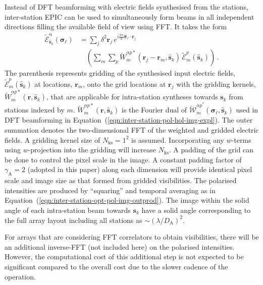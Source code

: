 \documentclass[
  journal=pasa,
  manuscript=article-type,
  year=2020,
  volume=37,
]{cup-journal}
\begin{document}
Instead of DFT beamforming with electric fields synthesised from the stations, inter-station EPIC can be used to simultaneously form beams in all independent directions filling the available field of view using FFT. It takes the form
\begin{align}
  \widetilde{\mathcal{E}}_{\hat{\boldsymbol{s}}_k}^\alpha(\boldsymbol{\sigma}_\ell) &= \sum_j \delta^2 \boldsymbol{r}_j \, e^{i\frac{2\pi}{\lambda} \hat{\boldsymbol{\sigma}}_\ell\cdot\boldsymbol{r}_j} \nonumber\\
  &\quad \left(\sum_{m} \sum_p \widetilde{W}_{m}^{\alpha p*}(\boldsymbol{r}_j-\boldsymbol{r}_{m},\hat{\boldsymbol{s}}_k) \, \widetilde{\mathcal{E}}_m^p(\hat{\boldsymbol{s}}_k) \right) \, . \label{eqn:inter-station-pol-hol-img-epic-expl}
\end{align}
The parenthesis represents gridding of the synthesised input electric fields, $\widetilde{\mathcal{E}}_m^p(\hat{\boldsymbol{s}}_k)$ at locations, $\boldsymbol{r}_{m}$, onto the grid locations at $\boldsymbol{r}_j$ with the gridding kernels, $\widetilde{W}_{m}^{\alpha p*}(\boldsymbol{r},\hat{\boldsymbol{s}}_k)$, that are applicable for intra-station syntheses towards $\boldsymbol{s}_k$ from stations indexed by $m$. $\widetilde{W}_{m}^{\alpha p*}(\boldsymbol{r},\hat{\boldsymbol{s}}_k)$ is the Fourier dual of $\widetilde{\mathcal{W}}_{m}^{{\alpha p}^*}(\boldsymbol{\sigma}_\ell,\hat{\boldsymbol{s}}_k)$ used in DFT beamforming in Equation~(\ref{eqn:inter-station-pol-hol-img-expl}). The outer summation denotes the two-dimensional FFT of the weighted and gridded electric fields. A gridding kernel size of $N_\textrm{ks}=1^2$ is assumed. Incorporating any $w$-terms using $w$-projection into the gridding will increase $N_\textrm{ks}$. A padding of the grid can be done to control the pixel scale in the image. A constant padding factor of $\gamma_\textrm{A}=2$ (adopted in this paper) along each dimension will provide identical pixel scale and image size as that formed from gridded visibilities. The polarised intensities are produced by ``squaring'' and temporal averaging as in Equation~(\ref{eqn:inter-station-opt-pol-img-outprod}). The image within the solid angle of each intra-station beam towards $\boldsymbol{s}_k$ have a solid angle corresponding to the full array layout including all stations as $\sim (\lambda/D_\textrm{A})^2$.

For arrays that are considering FFT correlators to obtain visibilities, there will be an additional inverse-FFT (not included here) on the polarised intensities. However, the computational cost of this additional step is not expected to be significant compared to the overall cost due to the slower cadence of the operation.
\end{document}
